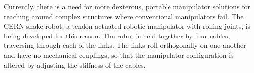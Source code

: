\documentclass[../main.tex]{subfiles}
\begin{document}
Currently, there is a need for more dexterous, portable manipulator solutions for reaching around complex structures where conventional manipulators fail. The CERN snake robot, a tendon-actuated robotic manipulator with rolling joints, is being developed for this reason. The robot is held together by four cables, traversing through each of the links. The links roll orthogonally on one another and have no mechanical couplings, so that the manipulator configuration is altered by adjusting the stiffness of the cables.




\end{document}
